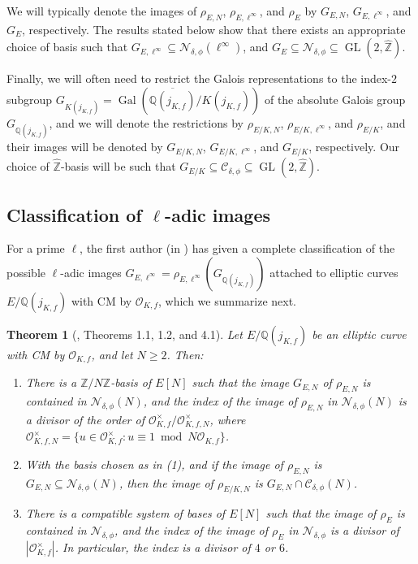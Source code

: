 \documentclass[11pt]{amsart}
\newtheorem{theorem}[defn]{Theorem}
\theoremstyle{definition}
\newcommand{\Q}{\mathbb{Q}}
\newcommand{\Z}{\mathbb{Z}}
\newcommand{\Of}{\mathcal{O}_{K,f}}
\newcommand{\OO}{\mathcal{O}}
\newcommand{\Gal}{\operatorname{Gal}}
\newcommand{\GL}{\operatorname{GL}}
\begin{document}
We will typically denote the images of $\rho_{E,N}$, $\rho_{E,\ell^\infty}$, and $\rho_E$ by $G_{E,N}$, $G_{E,\ell^\infty}$, and $G_E$, respectively. The results stated below show that there exists an appropriate choice of basis such that $G_{E,\ell^\infty} \subseteq \mathcal{N}_{\delta,\phi}(\ell^{\infty})$, and $G_E\subseteq \mathcal{N}_{\delta,\phi}\subseteq \GL(2,\widehat{\Z})$.

Finally, we will often need to restrict the Galois representations to the index-$2$ subgroup $G_{K(j_{K,f})}=\Gal(\overline{\Q(j_{K,f})}/K(j_{K,f}))$ of the absolute Galois group $G_{\Q(j_{K,f})}$, and we will denote the restrictions by $\rho_{E/K,N}$, $\rho_{E/K,\ell^\infty}$, and $\rho_{E/K}$, and their images will be denoted by  $G_{E/K,N}$, $G_{E/K,\ell^\infty}$, and $G_{E/K}$, respectively. Our choice of $\widehat{\Z}$-basis will be such that $G_{E/K}\subseteq \mathcal{C}_{\delta,\phi}\subseteq \GL(2,\widehat{\Z})$.

\subsection{Classification of \texorpdfstring{$\ell$}{ell}-adic images} \label{sec-alvaroCMresults}

For a prime $\ell$, the first author (in \cite{lozano-galoiscm}) has given a complete classification of the possible $\ell$-adic images $G_{E,\ell^\infty} = \rho_{E,\ell^{\infty}}(G_{\Q(j_{K,f})})$ attached to elliptic curves $E/\Q(j_{K,f})$ with CM by $\OO_{K,f}$, which we summarize next.

\begin{theorem}[\cite{lozano-galoiscm}, Theorems 1.1, 1.2, and 4.1]\label{thm-cmrep-intro-alvaro}\label{thm-firstofsec1} Let $E/\Q(j_{K,f})$ be an elliptic curve with CM by $\OO_{K,f}$, and let $N\geq 2$.
	 Then:
	\begin{enumerate}
            \item There is a $\Z/N\Z$-basis of $E[N]$ such that the image $G_{E,N}$ of $\rho_{E,N}$
	is contained in $\mathcal{N}_{\delta,\phi}(N)$, and	 the index of the image of $\rho_{E,N}$ in $\mathcal{N}_{\delta,\phi}(N)$ is a divisor of the order of $\Of^\times/\mathcal{O}_{K,f,N}^\times$, where $\mathcal{O}_{K,f,N}^\times=\{u\in\Of^\times: u\equiv 1 \bmod N\Of\}$.
    \item With the basis chosen as in (1), and if the image of $\rho_{E,N}$ is $G_{E,N}\subseteq \mathcal{N}_{\delta,\phi}(N)$, then the image of $\rho_{E/K,N}$ is $G_{E,N}\cap \mathcal{C}_{\delta,\phi}(N)$. 
		\item There is a compatible system of bases of $E[N]$ such that the image of $\rho_E$ is contained in $\mathcal{N}_{\delta,\phi}$, and the index of the image of $\rho_{E}$ in $\mathcal{N}_{\delta,\phi}$ is a divisor of $|\Of^\times|$. In particular, the index is a divisor of $4$ or $6$. 
	\end{enumerate} 
\end{theorem}
\end{document}
